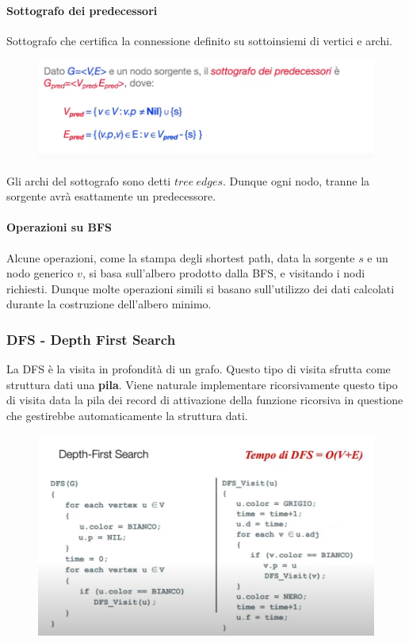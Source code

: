 \documentclass{article}
\begin{document}
\paragraph{Sottografo dei predecessori}

Sottografo che certifica la connessione definito su sottoinsiemi di vertici e archi.

\begin{figure}[htbp]
        \center
        \includegraphics[scale=0.5]{img/BFS3.png}
\end{figure}

Gli archi del sottografo sono detti $tree \: edges$. Dunque ogni nodo, tranne la sorgente avrà esattamente un predecessore.

\paragraph{Operazioni su BFS} Alcune operazioni, come la stampa degli shortest path, data la sorgente $s$ e un nodo generico $v$, si basa sull'albero prodotto dalla BFS, e visitando i nodi richiesti. Dunque molte operazioni simili si basano sull'utilizzo dei dati calcolati durante la costruzione dell'albero minimo.

\newpage

\subsubsection{DFS - Depth First Search}

La DFS è la visita in profondità di un grafo. Questo tipo di visita sfrutta come struttura dati una \textbf{pila}. Viene naturale implementare ricorsivamente questo tipo di visita data la pila dei record di attivazione della funzione ricorsiva in questione che gestirebbe automaticamente la struttura dati.

\begin{figure}[htbp]
        \center
        \includegraphics[scale=0.4]{img/DFS1.png}
\end{figure}
\end{document}
